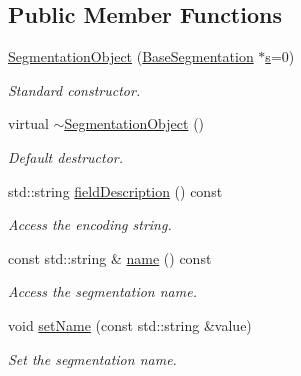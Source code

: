 \subsection*{Public Member Functions}
\begin{DoxyCompactItemize}
\item 
\hyperlink{class_d_d4hep_1_1_geometry_1_1_segmentation_object_a79ddebe4b3ce1664bac66bedff5dc096}{SegmentationObject} (\hyperlink{class_d_d4hep_1_1_d_d_segmentation_1_1_segmentation}{BaseSegmentation} $\ast$\hyperlink{_volumes_8cpp_a17ca6bfc8040d695d3cada22a4763d40}{s}=0)
\begin{DoxyCompactList}\small\item\em Standard constructor. \item\end{DoxyCompactList}\item 
virtual \hyperlink{class_d_d4hep_1_1_geometry_1_1_segmentation_object_ad2db3a9de2c3add55caf0c549cf93892}{$\sim$SegmentationObject} ()
\begin{DoxyCompactList}\small\item\em Default destructor. \item\end{DoxyCompactList}\item 
std::string \hyperlink{class_d_d4hep_1_1_geometry_1_1_segmentation_object_a6bc072f2300d6869228cd55a48bc1945}{fieldDescription} () const 
\begin{DoxyCompactList}\small\item\em Access the encoding string. \item\end{DoxyCompactList}\item 
const std::string \& \hyperlink{class_d_d4hep_1_1_geometry_1_1_segmentation_object_aad3049b7772dc945e0ce68deed8a0d23}{name} () const 
\begin{DoxyCompactList}\small\item\em Access the segmentation name. \item\end{DoxyCompactList}\item 
void \hyperlink{class_d_d4hep_1_1_geometry_1_1_segmentation_object_a41dcfab1ad8b2e330cb8a4c239026a17}{setName} (const std::string \&value)
\begin{DoxyCompactList}\small\item\em Set the segmentation name. \item\end{DoxyCompactList}\item 

\end{DoxyCompactItemize}
